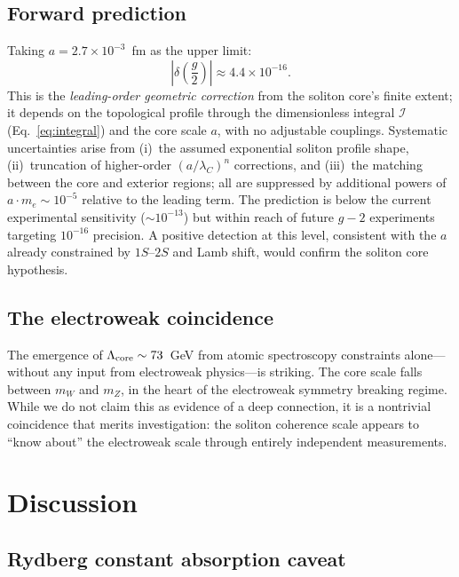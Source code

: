 ﻿\documentclass[a4paper,12pt]{article}
\begin{document}
\subsection{Forward prediction}

Taking $a=2.7\times 10^{-3}$~fm as the upper limit:
\begin{equation}
  \left|\delta\!\left(\frac{g}{2}\right)\right| \approx 4.4\times 10^{-16}.
  \label{eq:forward}
\end{equation}
This is the \emph{leading-order geometric correction} from the soliton core's finite extent; it depends on the topological profile through the dimensionless integral $\mathcal{I}$ (Eq.~\eqref{eq:integral}) and the core scale $a$, with no adjustable couplings.
Systematic uncertainties arise from (i)~the assumed exponential soliton profile shape, (ii)~truncation of higher-order $(a/\lambda_C)^n$ corrections, and (iii)~the matching between the core and exterior regions; all are suppressed by additional powers of $a\cdot m_e \sim 10^{-5}$ relative to the leading term.
The prediction is below the current experimental sensitivity ($\sim 10^{-13}$)
but within reach of future $g{-}2$ experiments targeting
$10^{-16}$ precision.  A positive detection at this
level, consistent with the $a$ already constrained by $1S$--$2S$ and Lamb shift, would confirm the soliton core hypothesis.

\subsection{The electroweak coincidence}

The emergence of $\Lambda_{\rm core}\sim 73$~GeV from atomic
spectroscopy constraints alone---without any input from electroweak
physics---is striking.  The core scale falls between $m_W$ and $m_Z$,
in the heart of the electroweak symmetry breaking regime.  While we do
not claim this as evidence of a deep connection, it is a nontrivial
coincidence that merits investigation: the soliton coherence scale
appears to ``know about'' the electroweak scale through entirely
independent measurements.

\section{Discussion}
\label{sec:discussion}

\subsection{Rydberg constant absorption caveat}
\label{sec:rydberg}
\end{document}

